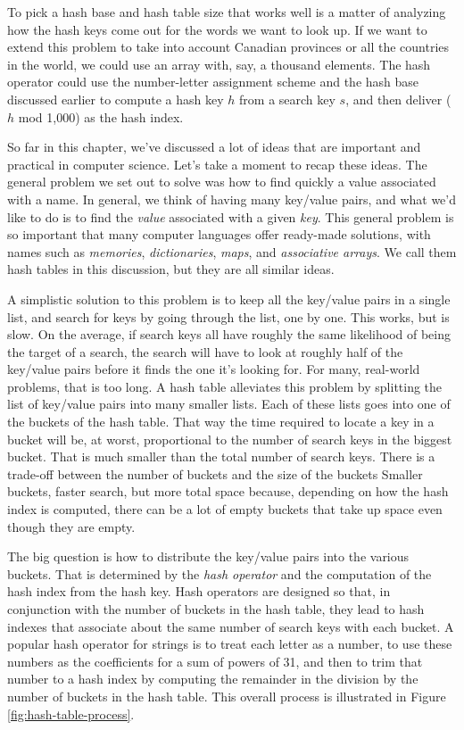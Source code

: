 To pick a hash base and hash table size 
that works well is a matter of analyzing how
the hash keys come out for the words we want to look up.
If we want to extend this problem to take into
account Canadian provinces or all the countries in the world, we could 
use an array with, say, a thousand elements. 
The hash operator could use the number-letter assignment scheme and
the hash base discussed earlier to compute a hash key $h$ from a search key $s$,
and then deliver ($h$ mod 1,000) as the hash index.

So far in this chapter, we've discussed a lot of ideas 
that are important and practical in computer science. 
Let's take a moment to recap these ideas.
The general problem we set out to solve was how to find quickly a value
associated with a name. In general, we think of having many key/value pairs,
and what we'd like to do is to find the \emph{value} associated with a given
\emph{key}. This general problem is so important that many computer languages
offer ready-made solutions, with names such as \emph{memories}, \emph{dictionaries},
\emph{maps}, and \emph{associative arrays}. 
We call them hash tables in this discussion, 
but they are all similar ideas.

A simplistic solution to this problem is to keep all the key/value pairs in a
single list, and search for keys by going through the list, one by one.
This works, but is slow.
On the average, if search keys all have roughly the same likelihood of
being the target of a search,
the search will have to look at roughly half
of the key/value pairs before it finds the one it's looking for.
For many, real-world problems, that is too long. 
A hash table alleviates this problem
by splitting the list of key/value pairs into many smaller lists.
Each of these lists goes into one of the buckets of the hash table.
That way the time required to locate a key
in a bucket will be, at worst, proportional 
to the number of search keys in the biggest bucket.
That is much smaller than the total number of search keys.
There is a trade-off between the number of buckets and the size of the buckets
Smaller buckets, faster search, but more total space because,
depending on how the hash index is computed, 
there can be a lot of empty buckets
that take up space even though they are empty.

The big question is how to distribute the key/value pairs into the various buckets.
That is determined by the \emph{hash operator} and
the computation of the hash index
from the hash key. Hash operators are
designed so that, in conjunction with the number of buckets
in the hash table, they lead to hash indexes 
that associate about the same number of search keys with each bucket. 
A popular hash operator for
strings is to treat each letter as a number, to use these numbers as the
coefficients for a sum of powers of 31, and then to trim that number to
a hash index by computing the remainder in the division by
the number of buckets in the hash table.
This overall process is illustrated in Figure \ref{fig:hash-table-process}.

